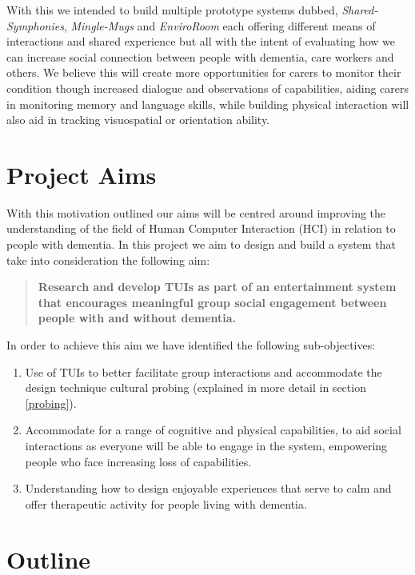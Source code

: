 With this we intended to build multiple prototype systems dubbed, \emph{Shared-Symphonies}, \emph{Mingle-Mugs} and \emph{EnviroRoom} each offering different means of interactions and shared experience but all with the intent of evaluating how we can increase social connection between people with dementia, care workers and others.
We believe this will create more opportunities for carers to monitor their condition though increased dialogue and observations of capabilities, aiding carers in monitoring memory and language skills, while building physical interaction will also aid in tracking visuospatial or orientation ability.

\section{Project Aims}
With this motivation outlined our aims will be centred around improving the understanding of the field of Human Computer Interaction (HCI) in relation to people with dementia.
In this project we aim to design and build a system that take into consideration the following aim:
\begin{quote}
\bf{Research and develop TUIs as part of an entertainment system that encourages meaningful group social engagement between people with and without dementia.}
\end{quote}
In order to achieve this aim we have identified the following sub-objectives:
\begin{enumerate}
\item Use of TUIs to better facilitate group interactions and accommodate the design technique cultural probing (explained in more detail in section \ref{probing}).
\item Accommodate for a range of cognitive and physical capabilities, to aid social interactions as everyone will be able to engage in the system, empowering people who face increasing loss of capabilities.
\item Understanding how to design enjoyable experiences that serve to calm and offer therapeutic activity for people living with dementia.
\end{enumerate}

\section{Outline}